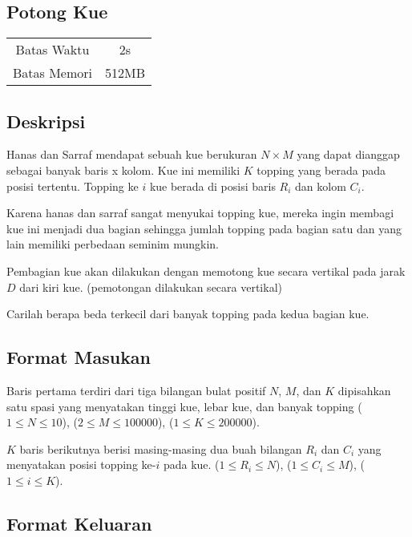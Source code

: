 \documentclass{article}
\begin{document}
\begin{center}
    \section*{Potong Kue} %

    \begin{tabular}{ | c c | }
        \hline
        Batas Waktu  & 2s \\    %
        Batas Memori & 512MB \\  %
        \hline
    \end{tabular}
\end{center}

\subsection*{Deskripsi}
Hanas dan Sarraf mendapat sebuah kue berukuran $N \times M$ yang dapat dianggap sebagai banyak baris x kolom. Kue ini memiliki $K$ topping yang berada pada posisi tertentu. Topping ke $i$ kue berada di posisi baris $R_i$ dan kolom $C_i$.

Karena hanas dan sarraf sangat menyukai topping kue, mereka ingin membagi
kue ini menjadi dua bagian sehingga jumlah topping pada bagian satu dan 
yang lain memiliki perbedaan seminim mungkin.

Pembagian kue akan dilakukan dengan memotong kue secara vertikal pada jarak $D$ dari kiri kue. (pemotongan dilakukan secara vertikal)

Carilah berapa beda terkecil dari banyak topping pada kedua bagian kue.

\subsection*{Format Masukan}

Baris pertama terdiri dari tiga bilangan bulat positif $N$, $M$, dan $K$ dipisahkan satu spasi yang menyatakan tinggi kue, lebar kue, dan banyak topping ($1 \leq N \leq 10$), ($2 \leq M \leq 100000$), ($1 \leq K \leq 200000$).

$K$ baris berikutnya berisi masing-masing dua buah bilangan $R_i$ dan $C_i$ yang menyatakan posisi topping ke-$i$ pada kue. ($1 \leq R_i \leq N$), ($1 \leq C_i \leq M$), ($1 \leq i \leq K$).

\subsection*{Format Keluaran}
\end{document}
